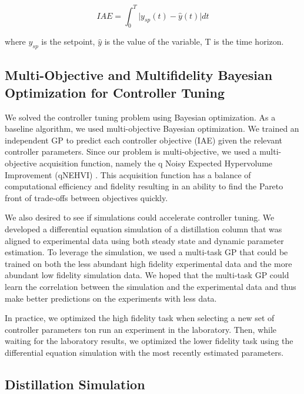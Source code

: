 \begin{equation}
    IAE = \int_0^T \vert y_{sp}(t) - \hat y(t) \vert dt
\end{equation}

where $y_{sp}$ is the setpoint,  $\hat y$  is the value of  the variable, T is the time horizon. 

\subsection{Multi-Objective and Multifidelity Bayesian Optimization for Controller Tuning}

We solved the controller tuning problem using Bayesian optimization. As a baseline algorithm, we used multi-objective Bayesian optimization. We trained an independent GP to predict each controller objective (IAE) given the relevant controller parameters.  Since our problem is multi-objective, we used a multi-objective acquisition function, namely the q Noisy Expected Hypervolume Improvement (qNEHVI) \cite{Balandat2020}. This acquisition function has a balance of computational efficiency and fidelity resulting in an ability to find the Pareto front of trade-offs between objectives quickly. 

We also desired to see if simulations could accelerate controller tuning. We developed a differential equation simulation of a distillation column that was aligned to experimental data using both steady state and dynamic parameter estimation. To leverage the simulation, we used a multi-task GP that could be trained on both the less abundant high fidelity experimental data and the more abundant low fidelity simulation data. We hoped that the multi-task GP could learn the correlation between the simulation and the experimental data and thus make better predictions on the experiments with less data.

In practice, we optimized the high fidelity task when selecting  a new set of controller parameters ton run an experiment in the laboratory. Then, while waiting for the laboratory results, we optimized the lower fidelity task using the differential equation simulation with the most recently estimated parameters. 


\subsection{Distillation Simulation}\label{sec:distillation_model}

